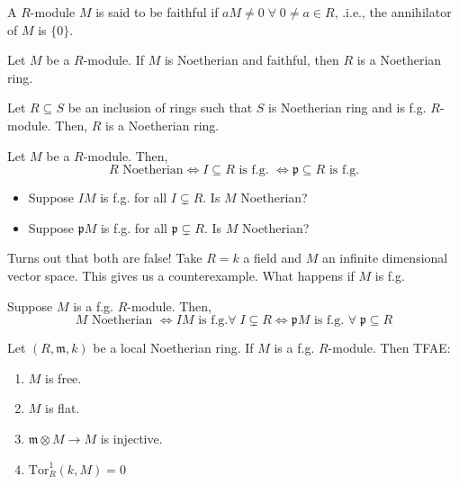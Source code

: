 \documentclass[oneside, 12pt]{scrbook}
\newcommand{\pr}{\mathfrak{p}}
\newcommand{\m}{\mathfrak{m}}
\theoremstyle{theorem}
\begin{document}
\begin{definition}
A $R$-module $M$ is said to be faithful if $aM\neq 0 \; \forall \; 0 \neq a \in R$, .i.e., the annihilator of $M$ is $\{0\}$.
\end{definition}

\begin{proposition}
Let $M$ be a $R$-module. If $M$ is Noetherian and faithful, then $R$ is a Noetherian ring.
\end{proposition}

\begin{theorem}
Let $R \subseteq S$ be an inclusion of rings such that $S$ is Noetherian ring and is f.g. $R$-module. Then, $R$ is a Noetherian ring.
\end{theorem}

Let $M$ be a $R$-module. Then, 
\begin{equation*}
R \text{ Noetherian} \Leftrightarrow I \subseteq R \text{ is f.g. } \Leftrightarrow \pr \subseteq R \text{ is f.g.}
\end{equation*}

\begin{itemize}
\item Suppose $IM$ is f.g. for all $I \subsetneq R$. Is $M$ Noetherian?
\item Suppose $\pr M$ is f.g. for all $\pr \subsetneq R$. Is $M$ Noetherian?
\end{itemize}
Turns out that both are false! Take $R=k$ a field and $M$ an infinite dimensional vector space. This gives us a counterexample. What happens if $M$ is f.g.

\begin{theorem}
Suppose $M$ is a f.g. $R$-module. Then, 
\begin{equation*}
M \text{ Noetherian } \Leftrightarrow IM \text{ is f.g.} \forall \; I \subsetneq R \Leftrightarrow \pr M \text{ is f.g. } \forall \; \pr \subseteq R
\end{equation*}
\end{theorem}

\begin{proposition}
Let $(R, \m , k)$ be a local Noetherian ring. If $M$ is a f.g. $R$-module. Then TFAE: 
\begin{enumerate}
\item $M$ is free.
\item $M$ is flat.
\item $\m \otimes M \rightarrow M$ is injective.
\item $\mathrm{Tor}_{R}^{1}(k,M) = 0$
\end{enumerate}
\end{proposition}
\end{document}
